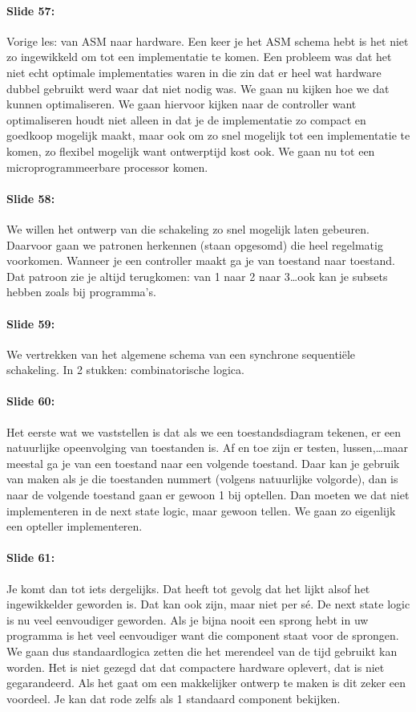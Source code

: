 \documentclass[10pt,a4paper]{book}
\begin{document}
\paragraph{Slide 57:} Vorige les: van ASM naar hardware. Een keer je het ASM schema hebt is het niet zo ingewikkeld om tot een implementatie te komen. Een probleem was dat het niet echt optimale implementaties waren in die zin dat er heel wat hardware dubbel gebruikt werd waar dat niet nodig was. We gaan nu kijken hoe we dat kunnen optimaliseren. We gaan hiervoor kijken naar de controller want optimaliseren houdt niet alleen in dat je de implementatie zo compact en goedkoop mogelijk maakt, maar ook om zo snel mogelijk tot een implementatie te komen, zo flexibel mogelijk want ontwerptijd kost ook. We gaan nu tot een microprogrammeerbare processor komen.

\paragraph{Slide 58:} We willen het ontwerp van die schakeling zo snel mogelijk laten gebeuren. Daarvoor gaan we patronen herkennen (staan opgesomd) die heel regelmatig voorkomen. Wanneer je een controller maakt ga je van toestand naar toestand. Dat patroon zie je altijd terugkomen: van 1 naar 2 naar 3\ldots ook kan je subsets hebben zoals bij programma's.

\paragraph{Slide 59:} We vertrekken van het algemene schema van een synchrone sequenti\"ele schakeling. In 2 stukken: combinatorische logica.

\paragraph{Slide 60:} Het eerste wat we vaststellen is dat als we een toestandsdiagram tekenen, er een natuurlijke opeenvolging van toestanden is. Af en toe zijn er testen, lussen,\ldots maar meestal ga je van een toestand naar een volgende toestand. Daar kan je gebruik van maken als je die toestanden nummert (volgens natuurlijke volgorde), dan is naar de volgende toestand gaan er gewoon 1 bij optellen. Dan moeten we dat niet implementeren in de next state logic, maar gewoon tellen. We gaan zo eigenlijk een opteller implementeren.

\paragraph{Slide 61:} Je komt dan tot iets dergelijks. Dat heeft tot gevolg dat het lijkt alsof het ingewikkelder geworden is. Dat kan ook zijn, maar niet per s\'e. De next state logic is nu veel eenvoudiger geworden. Als je bijna nooit een sprong hebt in uw programma is het veel eenvoudiger want die component staat voor de sprongen. We gaan dus standaardlogica zetten die het merendeel van de tijd gebruikt kan worden. Het is niet gezegd dat dat compactere hardware oplevert, dat is niet gegarandeerd. Als het gaat om een makkelijker ontwerp te maken is dit zeker een voordeel. Je kan dat rode zelfs als 1 standaard component bekijken.
\end{document}
